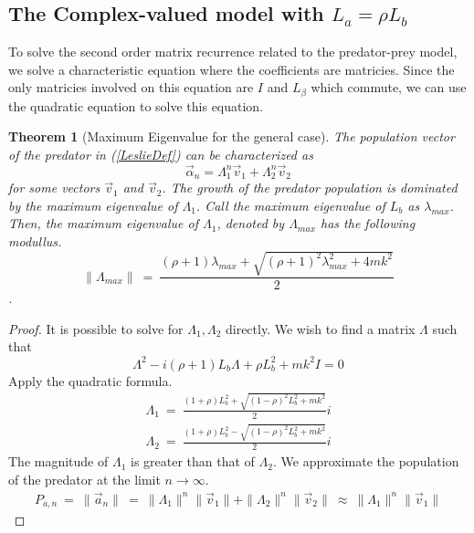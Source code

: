 \documentclass{article}
\newtheorem{theorem}{Theorem}[section]
\newtheorem{theorem}{Theorem}
\numberwithin{equation}{section}
\begin{document}
\subsection{The Complex-valued model with $L_a = \rho L_b$}

To solve the second order matrix 
recurrence related to 
the predator-prey model, 
we solve a characteristic equation 
where the coefficients are matricies. 
Since the only matricies involved on this equation are $I$ and $L_\beta$
which commute, we can use the quadratic equation to solve this equation. 


\begin{theorem}[Maximum Eigenvalue for the general case]\label{eqn:MaxEvalGen}
    The population vector of the predator in (\ref{LeslieDef}) 
    can be characterized as 
    \begin{equation}
    \vec \alpha_n =\Lambda_1^{n}  \vec v_1+ \Lambda_2^{n}\vec v_2
    \end{equation}
    for some vectors $\vec v_1$ and $\vec v_2$. The 
    growth of the predator population 
    is dominated by the maximum eigenvalue 
    of $\Lambda_1$. Call the maximum eigenvalue of $L_b$ 
    as $\lambda_{max}$. Then, the maximum eigenvalue of $\Lambda_1$, 
    denoted by $\Lambda_{max}$ has the following modullus. 
    \begin{equation}
        \|\Lambda_{max} \| \ =\   \frac {
            (\rho + 1)\lambda_{max} + \sqrt{(\rho + 1)^2 \lambda_{max}^2 + 4mk^2}
        } 2
    \end{equation}. 
\end{theorem}
\begin{proof}
    It is possible to solve for $\Lambda_1, \Lambda_2$ directly. 
We wish to find a matrix $\Lambda$ such that 
\begin{equation}
\Lambda^2 - i(\rho + 1) L_b \Lambda + \rho L_b^2+ mk^2 I = 0
\end{equation}
    Apply the quadratic formula. 
    \begin{eqnarray}
        \Lambda_1 \ = \ 
        \frac {
        (1 + \rho) L_b^2 + 
        \sqrt{
        (1-\rho)^2L_b^2 + mk^2
        }
        } 2 i \nonumber \\ 
 \Lambda_2 \ = \ 
        \frac {
        (1 + \rho) L_b^2 - 
        \sqrt{
        (1-\rho)^2L_b^2 + mk^2
        }
        } 2 i
    \end{eqnarray}
    The magnitude of $\Lambda_1$ is greater than that of $\Lambda_2$. 
    We approximate the population of the predator at the limit $n \rightarrow \infty$. 
    \begin{eqnarray}
        P_{a, n} \ = \ \|\vec a_n\| \ = \ 
        \|\Lambda_1\|^n \|\vec v_1\| + 
 \|\Lambda_2\|^n \|\vec v_2\| 
 \ \approx  \ 
\|\Lambda_1\|^n \|\vec v_1\|
    \end{eqnarray}
\end{proof}
\end{document}
